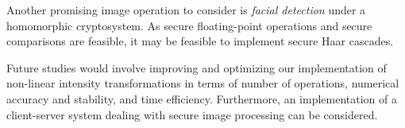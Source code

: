 Another promising image operation to consider is \textit{facial detection} under a homomorphic cryptosystem. 
As secure floating-point operations and secure comparisons are feasible, it may be feasible to implement secure Haar cascades.

Future studies would involve improving and optimizing our implementation of non-linear intensity transformations in terms of number of operations, numerical accuracy and stability, and time efficiency.
Furthermore, an implementation of a client-server system dealing with secure image processing can be considered.

